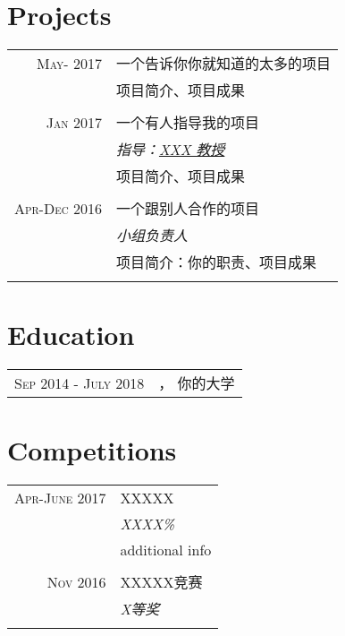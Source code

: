 \documentclass[a4paper,10pt]{article}
\begin{document}
\section{Projects}
\begin{tabular}{r|p{11cm}}
 \textsc{May- 2017} & 一个告诉你你就知道的太多的项目 \\&
  \footnotesize{项目简介、项目成果}
\\\multicolumn{2}{c}{} \\
 \textsc{Jan 2017} & 一个有人指导我的项目 \\&
 \emph{\textsc{指导：}\hspace{0.2cm}\href{mailto:prof@amazing.edu.cn}{XXX 教授}}\\&
  \footnotesize{项目简介、项目成果}
\\\multicolumn{2}{c}{} \\
 \textsc{Apr-Dec 2016} & 一个跟别人合作的项目\\&
  \emph{小组负责人}\\&
  \footnotesize{项目简介：你的职责、项目成果}
\\\multicolumn{2}{c}{} \\
\end{tabular}

\section{Education}
\begin{tabular}{rl}
  \textsc{Sep} 2014 - \textsc{July} 2018 & ， \textsc{你的大学}\\
\end{tabular}

\section{Competitions}
\begin{tabular}{r|p{11cm}}
 \textsc{Apr-June 2017} &XXXXX\\&
 \emph{XXXX\%}\\&
  \footnotesize{additional info}
\\\multicolumn{2}{c}{} \\
 \textsc{Nov 2016} & XXXXX竞赛\\&
 \emph{X等奖}
\\\multicolumn{2}{c}{} \\
\end{tabular}



\end{document}
